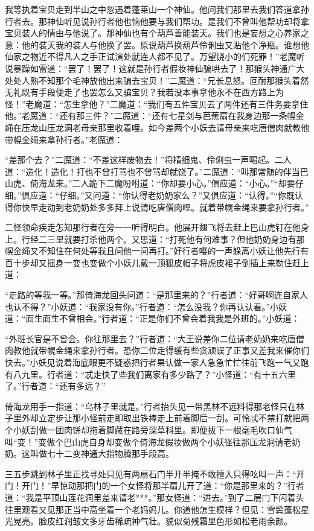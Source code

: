 \documentclass[12pt,UTF8]{ctexbook}
\begin{document}
我等执着宝贝走到半山之中忽遇着蓬莱山一个神仙。他问我们那里去我们答道拿孙行者去。那神仙听见说孙行者他也恼他要与我们帮功。是我们不曾叫他帮功却将拿宝贝装人的情由与他说了。那神仙也有个葫芦善能装天。我们也是妄想之心养家之意：他的装天我的装人与他换了罢。原说葫芦换葫芦伶俐虫又贴他个净瓶。谁想他仙家之物近不得凡人之手正试演处就连人都不见了。万望饶小的们死罪！”老魔听说暴躁如雷道：“罢了！罢了！这就是孙行者假妆神仙骗哄去了！那猴头神通广大处处人熟不知那个毛神放他出来骗去宝贝！”二魔道：“兄长息怒。叵耐那猴头着然无礼既有手段便走了也罢怎么又骗宝贝？我若没本事拿他永不在西方路上为怪！”老魔道：“怎生拿他？”二魔道：“我们有五件宝贝去了两件还有三件务要拿住他。”老魔道：“还有那三件？”二魔道：“还有七星剑与芭蕉扇在我身边那一条幌金绳在压龙山压龙洞老母亲那里收着哩。如今差两个小妖去请母亲来吃唐僧肉就教他带幌金绳来拿孙行者。”老魔道：

“差那个去？”二魔道：“不差这样废物去！”将精细鬼、伶俐虫一声喝起。二人道：“造化！造化！打也不曾打骂也不曾骂却就饶了。”二魔道：“叫那常随的伴当巴山虎、倚海龙来。”二人跪下二魔吩咐道：“你却要小心。”俱应道：“小心。”“却要仔细。”俱应道：“仔细。”又问道：“你认得老奶奶家么？”又俱应道：“认得。”“你既认得你快早走动到老奶奶处多多拜上说请吃唐僧肉哩。就着带幌金绳来要拿孙行者。”

二怪领命疾走怎知那行者在旁一一听得明白。他展开翅飞将去赶上巴山虎钉在他身上。行经二三里就要打杀他两个。又思道：“打死他有何难事？但他奶奶身边有那幌金绳又不知住在何处等我且问他一问再打。”好行者嘤的一声躲离小妖让他先行有百十步却又摇身一变也变做个小妖儿戴一顶狐皮帽子将虎皮裙子倒插上来勒住赶上道：

“走路的等我一等。”那倚海龙回头问道：“是那里来的？”行者道：“好哥啊连自家人也认不得？”小妖道：“我家没有你。”行者道：“怎么没我？你再认认看。”小妖道：“面生面生不曾相会。”行者道：“正是你们不曾会着我我是外班的。”小妖道：

“外班长官是不曾会。你往那里去？”行者道：“大王说差你二位请老奶奶来吃唐僧肉教他就带幌金绳来拿孙行者。恐你二位走得缓有些贪顽误了正事又差我来催你们快去。”小妖见说着海底眼更不疑惑把行者果认做一家人急急忙忙往前飞跑一气又跑有八九里。行者道：“忒走快了些我们离家有多少路了？”小怪道：“有十五六里了。”行者道：“还有多远？”

倚海龙用手一指道：“乌林子里就是。”行者抬头见一带黑林不远料得那老怪只在林子里外却立定步让那小怪前走即取出铁棒走上前着脚后一刮。可怜忒不禁打就把两个小妖刮做一团肉饼却拖着脚藏在路旁深草科里。即便拔下一根毫毛吹口仙气叫“变！”变做个巴山虎自身却变做个倚海龙假妆做两个小妖径往那压龙洞请老奶奶。这叫做七十二变神通大指物腾那手段高。

三五步跳到林子里正找寻处只见有两扇石门半开半掩不敢擅入只得吆叫一声：“开门！开门！”早惊动那把门的一个女怪将那半扇儿开了道：“你是那里来的？”行者道：“我是平顶山莲花洞里差来请老***。”那女怪道：“进去。”到了二层门下闪着头往里观看又见那正当中高坐着一个老妈妈儿。你道他怎生模样？但见：雪鬓蓬松星光晃亮。脸皮红润皱文多牙齿稀疏神气壮。貌似菊残霜里色形如松老雨余颜。
\end{document}
